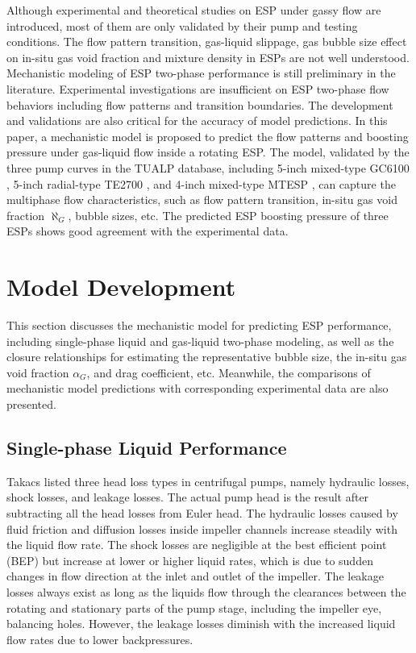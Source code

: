 \documentclass[preprint,12pt]{elsarticle}
\begin{document}
Although experimental and theoretical studies on ESP under gassy flow are introduced, most of them are only validated by their pump and testing conditions. The flow pattern transition, gas-liquid slippage, gas bubble size effect on in-situ gas void fraction and mixture density in ESPs are not well understood. Mechanistic modeling of ESP two-phase performance is still preliminary in the literature. Experimental investigations are insufficient on ESP two-phase flow behaviors including flow patterns and transition boundaries. The development and validations are also critical for the accuracy of model predictions. In this paper, a mechanistic model is proposed to predict the flow patterns and boosting pressure under gas-liquid flow inside a rotating ESP. The model, validated by the three pump curves in the TUALP database, including 5-inch mixed-type GC6100 \cite{gamboa2009prediction}, 5-inch radial-type TE2700 \cite{zhu2017phd}, and 4-inch mixed-type MTESP \cite{zhu2020experimental}, can capture the multiphase flow characteristics, such as flow pattern transition, in-situ gas void fraction $\aleph_G$, bubble sizes, etc. The predicted ESP boosting pressure of three ESPs shows good agreement with the experimental data. 



\section{Model Development}
\label{S:Model Development}
This section discusses the mechanistic model for predicting ESP performance, including single-phase liquid and gas-liquid two-phase modeling, as well as the closure relationships for estimating the representative bubble size, the in-situ gas void fraction $\alpha_G$, and drag coefficient, etc. Meanwhile, the comparisons of mechanistic model predictions with corresponding experimental data are also presented.

\subsection{Single-phase Liquid Performance}
Takacs \cite{takacs2017electrical} listed three head loss types in centrifugal pumps, namely hydraulic losses, shock losses, and leakage losses. The actual pump head is the result after subtracting all the head losses from Euler head. The hydraulic losses caused by fluid friction and diffusion losses inside impeller channels increase steadily with the liquid flow rate. The shock losses are negligible at the best efficient point (BEP) but increase at lower or higher liquid rates, which is due to sudden changes in flow direction at the inlet and outlet of the impeller. The leakage losses always exist as long as the liquids flow through the clearances between the rotating and stationary parts of the pump stage, including the impeller eye, balancing holes. However, the leakage losses diminish with the increased liquid flow rates due to lower backpressures.
\end{document}
